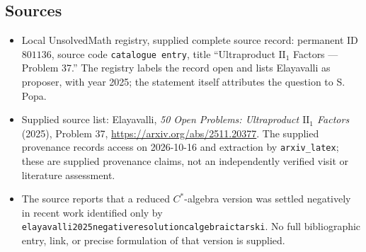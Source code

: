 \documentclass[11pt]{article}
\begin{document}
\subsection{Sources}
\begin{itemize}
\item Local UnsolvedMath registry, supplied complete source record: permanent ID \(801136\), source code \texttt{catalogue entry}, title ``Ultraproduct \(\mathrm{II}_1\) Factors --- Problem 37.'' The registry labels the record open and lists Elayavalli as proposer, with year 2025; the statement itself attributes the question to S. Popa.
\item Supplied source list: Elayavalli, \emph{50 Open Problems: Ultraproduct \(\mathrm{II}_1\) Factors} (2025), Problem 37, \url{https://arxiv.org/abs/2511.20377}. The supplied provenance records access on 2026-10-16 and extraction by \texttt{arxiv\_latex}; these are supplied provenance claims, not an independently verified visit or literature assessment.
\item The source reports that a reduced \(C^*\)-algebra version was settled negatively in recent work identified only by \texttt{elayavalli2025negativeresolutioncalgebraictarski}. No full bibliographic entry, link, or precise formulation of that version is supplied.
\end{itemize}
\end{document}
